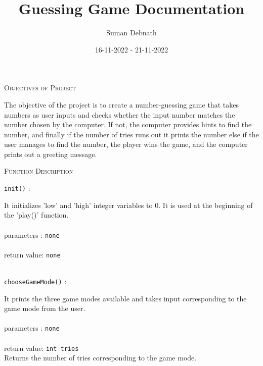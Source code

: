 \documentclass{report}
\title{\Huge{Guessing Game Documentation}}
\author{\Huge{Suman Debnath \vspace{7mm}}}
\date{\Large{16-11-2022 \hspace{2mm} - \hspace{2mm} 21-11-2022}}
\begin{document}
\maketitle

\begin{center}
	\textsc{\LARGE{Objectives of Project}} 
\end{center}

\hfill

The objective of the project is to create a number-guessing game that takes numbers as user inputs and checks whether the input number matches the number chosen by the computer. If not, the computer provides hints to find the number, and finally if the number of tries runs out it prints the number else if the user manages to find the number, the player wins the game, and the computer prints out a greeting message. 

\hfill

\begin{center}
	\textsc{\LARGE{Function Description}}
\end{center}

\hfill

\begin{flushleft}
\texttt{init()}
\textsf{ : }
\end{flushleft}
\begin{flushright}
\hfill\begin{minipage}{0.85\linewidth}
	\textsf{		It initializes 'low' and 'high' integer variables to 0. It is used at the beginning of the 'play()' function.} \\ \\
	\textsf{parameters : }
	\texttt{none} \\ \\
	\textsf{return value: }
	\texttt{none}	\\ \\
\end{minipage}
\end{flushright}

\begin{flushleft}
\texttt{chooseGameMode()}
\textsf{ : }
\end{flushleft}
\begin{flushright}
\hfill\begin{minipage}{0.85\linewidth}
	\textsf{		It prints the three game modes available and takes input corresponding to the game mode from the user. } \\ \\
	\textsf{parameters : }
	\texttt{none} \\ \\
	
	\textsf{return value: }
	\texttt{int tries }	\\
	\textsf{ Returns the number of tries corresponding to the game mode. }\\ \\
\end{minipage}
\end{flushright}
\end{document}
